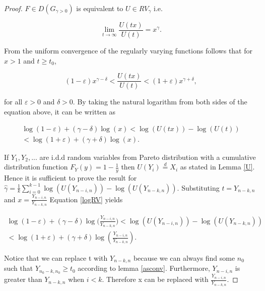\documentclass[english,12pt,a4paper,pdftex,sci,utf8]{aaltothesis} %
\begin{document}
\begin{proof}

$F \in D(G_{\gamma>0})$ is equivalent to $U \in RV_{\gamma}$ i.e.

\begin{equation*}
\lim_{t\to\infty} \frac{U(tx)}{U(t)} = x^{\gamma}.
\end{equation*}

From the uniform convergence of the regularly varying functions follows that for $x>1$ and $t \geq t_0$,

\begin{equation*}
(1-\varepsilon) x^{\gamma - \delta} < \frac{U(tx)}{U(t)} < (1+\varepsilon) x^{\gamma + \delta},
\end{equation*}

for all $\varepsilon>0$ and $\delta>0$. By taking the natural logarithm from both sides of the equation above, it can be written as

\begin{equation}
\begin{split}
\log(1 - \varepsilon) + (\gamma - \delta) \log(x) < \log(U(tx)) - \log(U(t)) \\
< \log(1 + \varepsilon) + (\gamma + \delta) \log(x).
\end{split}
\label{logRV}
\end{equation}

If $Y_1, Y_2,...$ are i.d.d random variables from Pareto distribution with a cumulative distribution function $F_Y(y) = 1 - \frac{1}{y}$ then $U(Y_i)  \overset{d}{=} X_i$  as stated in Lemma \ref{U}. Hence it is sufficient to prove the result for $ \hat{\gamma} =  \frac{1}{k} \sum_{i=0}^{k-1} \log(U(Y_{n-i,n})) - \log(U(Y_{n-k,n})) $. Substituting $t = Y_{n-k,n}$ and $x =\frac{Y_{n-i,n}}{Y_{n-k,n}}$ Equation \eqref{logRV} yields


\begin{equation}
\begin{split}
\log(1 - \varepsilon) + (\gamma - \delta) \log\Big(\frac{Y_{n-i,n}}{Y_{n-k,n}}\Big) < \log(U(Y_{n-i,n})) - \log(U(Y_{n-k,n})) \\
< \log(1 + \varepsilon) + (\gamma + \delta) \log(\frac{Y_{n-i,n}}{Y_{n-k,n}}).
\end{split}
\label{log}
\end{equation}

Notice that we can replace t with $Y_{n-k,n}$ because we can always find some $n_0$ such that $Y_{n_0-k,n_0} \geq t_0$ according to lemma \ref{asconv}. Furthermore, $Y_{n-i,n}$ is greater than $Y_{n-k,n}$ when $i<k$. Therefore x can be replaced with $\frac{Y_{n-i,n}}{Y_{n-k,n}}$.


\end{proof}
\end{document}
